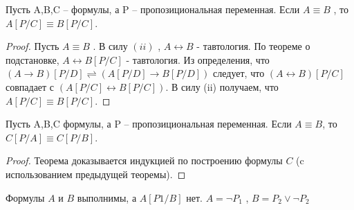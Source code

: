 \begin{theorem}
	Пусть A,B,C -- формулы, а P -- пропозициональная
	переменная. Если $A\equiv B$ , то $A[P/C] \equiv B[P/C]$.
\end{theorem}
\begin{proof}
	Пусть $ {A}\equiv{B} $ . В силу $(ii)$ ,  ${A}\leftrightarrow{B}$  - тавтология. По теореме о подстановке,
	${A}\leftrightarrow B[P/C]$ - тавтология.
	Из определения, что $(A \rightarrow B)[P / D] \rightleftharpoons(A[P / D] \rightarrow B[P / D])$  следует, что
	$(A \leftrightarrow B)[P / C] $ совпадает с 
	$(A[P / C] \leftrightarrow B[P / C])$. В силу (ii) получаем, что $A[P/C] \equiv B[P/C]$.
\end{proof}
\begin{theorem}
	Пусть A,B,C формулы, а P -- пропозициональная переменная. Если $A\equiv B$, то $C[P/A]\equiv C[P/B]$.
\end{theorem}
\begin{proof}
	Теорема доказывается индукцией по построению формулы $C$ (c использованием предыдущей теоремы).
\end{proof}
\begin{example}
	Формулы $A$ и $B$ выполнимы, а $A[P1/B]$ нет.  $A=\neg P_{1}$ , $B=P_{2} \vee \neg P_{2}$
\end{example}
